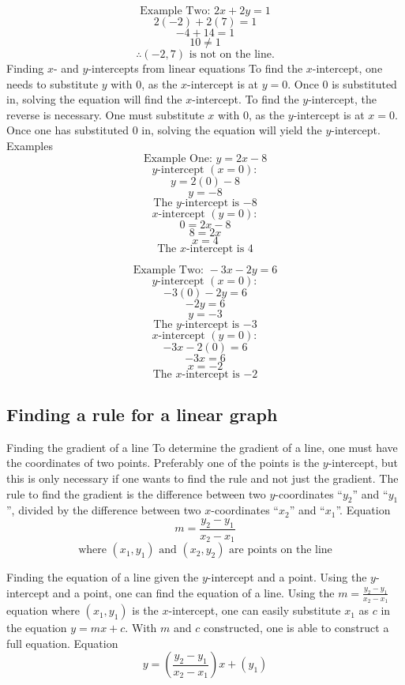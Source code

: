 \begin{outline}
				\[\text{Example Two: }2x+2y=1\]
				\[2(-2) + 2(7) = 1\]
				\[-4 + 14 = 1\]
				\[10 \ne 1\]
				\[\therefore (-2, 7) \text{ is not on the line.}\]
	\1 Finding $x$- and $y$-intercepts from linear equations
		\2 To find the $x$-intercept, one needs to substitute $y$ with $0$, as the $x$-intercept is at $y=0$. Once $0$ is substituted in, solving the equation will find the $x$-intercept. To find the $y$-intercept, the reverse is necessary. One must substitute $x$ with $0$, as the $y$-intercept is at $x=0$. Once one has substituted $0$ in, solving the equation will yield the $y$-intercept.
			\3 Examples
				\[\text{Example One: }y = 2x - 8\]
				\[y\text{-intercept } (x=0):\]
				\[y = 2(0) - 8\]
				\[y = -8\]
				\[\text{The }y\text{-intercept is }{-8}\]
				\[x\text{-intercept } (y=0):\]
				\[0 = 2x - 8\]
				\[8 = 2x\]
				\[x = 4\]
				\[\text{The }x\text{-intercept is }4\]
				
				\[\text{Example Two: }-3x - 2y = 6\]
				\[y\text{-intercept }(x=0):\]
				\[-3(0) - 2y = 6\]
				\[-2y = 6\]
				\[y = -3\]
				\[\text{The }y\text{-intercept is }{-3}\]
				\[x\text{-intercept } (y=0):\]
				\[-3x - 2(0) = 6\]
				\[-3x = 6\]
				\[x = -2\]
				\[\text{The }x\text{-intercept is }{-2}\]

\0
\subsection{Finding a rule for a linear graph}
	\1 Finding the gradient of a line
		\2 To determine the gradient of a line, one must have the coordinates of two points. Preferably one of the points is the $y$-intercept, but this is only necessary if one wants to find the rule and not just the gradient. The rule to find the gradient is the difference between two $y$-coordinates ``$y_2$'' and ``$y_1$'', divided by the difference between two $x$-coordinates ``$x_2$'' and ``$x_1$''.
			\3 Equation
				\[m = \frac{y_2 - y_1}{x_2 - x_1}\]
				\[\text{where }(x_1, y_1)\text{ and }(x_2, y_2)\text{ are points on the line}\]
				
	\1 Finding the equation of a line given the $y$-intercept and a point.
		\2 Using the $y$-intercept and a point, one can find the equation of a line. Using the $m = \frac{y_2 - y_1}{x_2 - x_1}$ equation where $(x_1, y_1)$ is the $x$-intercept, one can easily substitute $x_1$ as $c$ in the equation $y = mx + c$. With $m$ and $c$ constructed, one is able to construct a full equation.
			\3 Equation
				\[y = \left(\frac{y_2 - y_1}{x_2 - x_1}\right)x + (y_1)\]
 

\end{outline}
